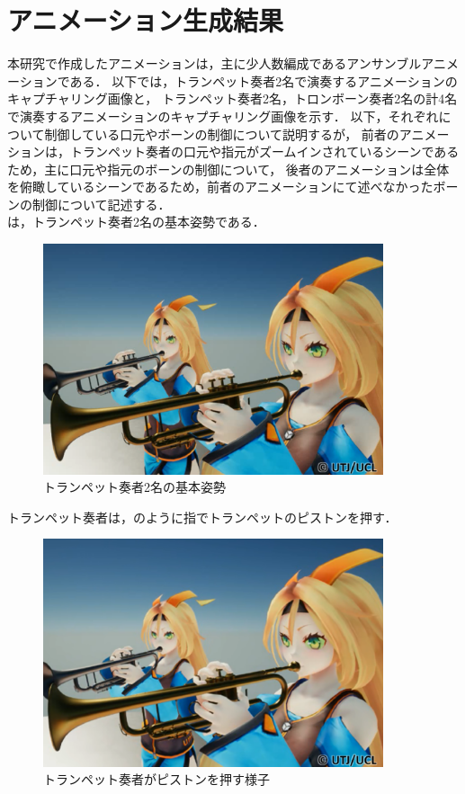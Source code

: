 \section{アニメーション生成結果} \label{sec:result}
本研究で作成したアニメーションは，主に少人数編成であるアンサンブルアニメーションである．
以下では，トランペット奏者2名で演奏するアニメーションのキャプチャリング画像と，
トランペット奏者2名，トロンボーン奏者2名の計4名で演奏するアニメーションのキャプチャリング画像を示す．
以下，それぞれについて制御している口元やボーンの制御について説明するが，
前者のアニメーションは，トランペット奏者の口元や指元がズームインされているシーンであるため，主に口元や指元のボーンの制御について，
後者のアニメーションは全体を俯瞰しているシーンであるため，前者のアニメーションにて述べなかったボーンの制御について記述する．\\
\indent
{}は，トランペット奏者2名の基本姿勢である．
\begin{figure}[h]
	\centering
	\includegraphics[width=10cm]{fig/chap4/anim1.eps}
	\caption{トランペット奏者2名の基本姿勢}
	\label{fig:anim1}
\end{figure}
トランペット奏者は，のように指でトランペットのピストンを押す．
\begin{figure}[h]
	\centering
	\includegraphics[width=10cm]{fig/chap4/anim1_finger.eps}
	\caption{トランペット奏者がピストンを押す様子}
	\label{fig:anim1_finger}
\end{figure}
